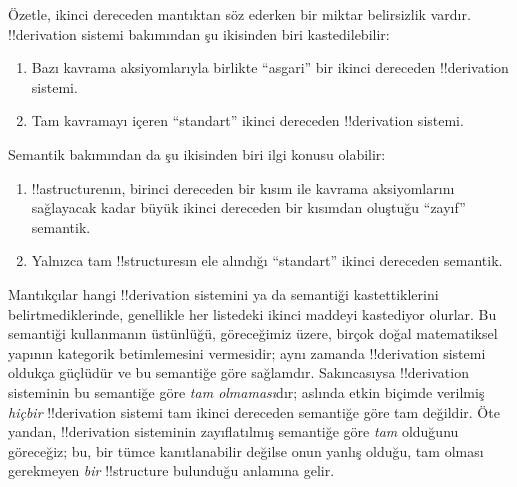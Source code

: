 \documentclass[../../../include/open-logic-section]{subfiles}
\begin{document}
Özetle, ikinci dereceden mantıktan söz ederken bir miktar belirsizlik vardır.
!!{derivation} sistemi bakımından şu ikisinden biri kastedilebilir:
\begin{enumerate}
\item Bazı kavrama aksiyomlarıyla birlikte ``asgari'' bir ikinci dereceden
  !!{derivation} sistemi.
\item Tam kavramayı içeren ``standart'' ikinci dereceden !!{derivation}
  sistemi.
\end{enumerate}
Semantik bakımından da şu ikisinden biri ilgi konusu olabilir:
\begin{enumerate}
\item !!a{structure}{}nın, birinci dereceden bir kısım ile kavrama aksiyomlarını
  sağlayacak kadar büyük ikinci dereceden bir kısımdan oluştuğu ``zayıf''
  semantik.
\item Yalnızca tam !!{structure}s{}ın ele alındığı ``standart'' ikinci dereceden
  semantik.
\end{enumerate}
Mantıkçılar hangi !!{derivation} sistemini ya da semantiği kastettiklerini
belirtmediklerinde, genellikle her listedeki ikinci maddeyi kastediyor olurlar.
Bu semantiği kullanmanın üstünlüğü, göreceğimiz üzere, birçok doğal matematiksel
yapının kategorik betimlemesini vermesidir; aynı zamanda !!{derivation} sistemi
oldukça güçlüdür ve bu semantiğe göre sağlamdır. Sakıncasıysa !!{derivation}
sisteminin bu semantiğe göre \emph{tam olmaması}dır; aslında etkin biçimde
verilmiş \emph{hiçbir} !!{derivation} sistemi tam ikinci dereceden semantiğe
göre tam değildir. Öte yandan, !!{derivation} sisteminin zayıflatılmış
semantiğe göre \emph{tam} olduğunu göreceğiz; bu, bir tümce kanıtlanabilir
değilse onun yanlış olduğu, tam olması gerekmeyen \emph{bir} !!{structure}
bulunduğu anlamına gelir.
\end{document}
